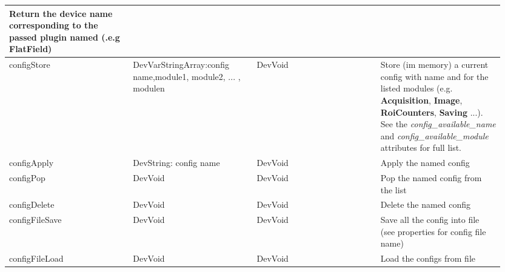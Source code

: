 \documentclass[letterpaper,10pt,english]{sphinxmanual}
\begin{document}
\begin{tabular}{|p{0.237\linewidth}|p{0.237\linewidth}|p{0.237\linewidth}|p{0.237\linewidth}|}
Return the device name corresponding to the passed plugin named (.e.g FlatField)
\\
\hline
configStore
 & 
DevVarStringArray:config name,module1,
module2, ... , modulen
 & 
DevVoid
 & 
Store (im memory) a current config with name and for the listed modules (e.g. \textbf{Acquisition},
\textbf{Image}, \textbf{RoiCounters}, \textbf{Saving} ...).
See the \emph{config\_available\_name} and \emph{config\_available\_module} attributes for full list.
\\
\hline
configApply
 & 
DevString: config name
 & 
DevVoid
 & 
Apply the named config
\\
\hline
configPop
 & 
DevVoid
 & 
DevVoid
 & 
Pop the named config from the list
\\
\hline
configDelete
 & 
DevVoid
 & 
DevVoid
 & 
Delete the named config
\\
\hline
configFileSave
 & 
DevVoid
 & 
DevVoid
 & 
Save all the config into file (see properties for config file name)
\\
\hline
configFileLoad
 & 
DevVoid
 & 
DevVoid
 & 
Load the configs from file
\\
\hline\end{tabular}
\end{document}
